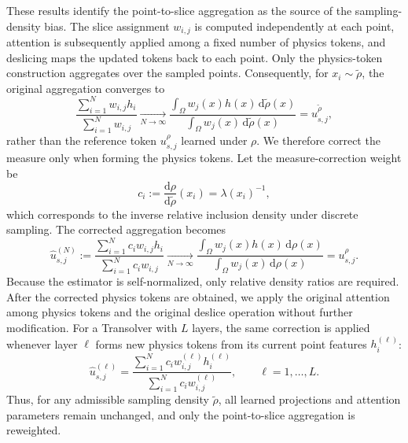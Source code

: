 These results identify the point-to-slice aggregation as the source of the sampling-density bias. The slice assignment $w_{i,j}$ is computed independently at each point, attention is subsequently applied among a fixed number of physics tokens, and deslicing maps the updated tokens back to each point. Only the physics-token construction aggregates over the sampled points. Consequently, for $x_i\sim\widetilde{\rho}$, the original aggregation converges to
\begin{equation}
    \frac{\sum_{i=1}^{N}w_{i,j}h_i}
    {\sum_{i=1}^{N}w_{i,j}}
    \xrightarrow[N\to\infty]{}
    \frac{\int_{\Omega}w_j(x)h(x)\,\mathrm{d}\widetilde{\rho}(x)}
    {\int_{\Omega}w_j(x)\,\mathrm{d}\widetilde{\rho}(x)}
    =u_{s,j}^{\widetilde{\rho}},
    \label{eq:uncorrected_shifted_physics_token}
\end{equation}
rather than the reference token $u_{s,j}^{\rho}$ learned under $\rho$. We therefore correct the measure only when forming the physics tokens.
Let the measure-correction weight be
\begin{equation}
    c_i
    := \frac{\mathrm{d}\rho}{\mathrm{d}\widetilde{\rho}}(x_i)
    = \lambda(x_i)^{-1},
    \label{eq:main_importance_weight}
\end{equation}
which corresponds to the inverse relative inclusion density under discrete sampling.
The corrected aggregation becomes
\begin{equation}
    \widehat{u}_{s,j}^{(N)}
    :=\frac{\sum_{i=1}^{N}c_iw_{i,j}h_i}
    {\sum_{i=1}^{N}c_iw_{i,j}}
    \xrightarrow[N\to\infty]{}
    \frac{\int_{\Omega}w_j(x)h(x)\,\mathrm{d}\rho(x)}
    {\int_{\Omega}w_j(x)\,\mathrm{d}\rho(x)}
    =u_{s,j}^{\rho}.
    \label{eq:density_consistent_physics_token}
\end{equation}
Because the estimator is self-normalized, only relative density ratios are required. After the corrected physics tokens are obtained, we apply the original attention among physics tokens and the original deslice operation without further modification. For a Transolver with $L$ layers, the same correction is applied whenever layer $\ell$ forms new physics tokens from its current point features $h_i^{(\ell)}$:
\begin{equation}
    \widehat{u}_{s,j}^{(\ell)}
    =\frac{\sum_{i=1}^{N}c_iw_{i,j}^{(\ell)}h_i^{(\ell)}}
    {\sum_{i=1}^{N}c_iw_{i,j}^{(\ell)}},
    \qquad \ell=1,\ldots,L.
    \label{eq:layerwise_density_correction}
\end{equation}
Thus, for any admissible sampling density \(\widetilde{\rho}\), all learned projections and attention parameters remain unchanged, and only the point-to-slice aggregation is reweighted.
